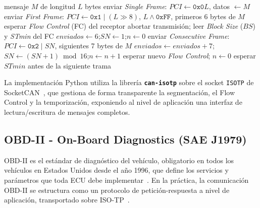 \begin{algorithm}[H]
\caption{Transmisión segmentada de un mensaje según ISO-TP (ISO~15765-2).}
\label{alg:isotp_tx}
\begin{algorithmic}[1]
\Require mensaje $M$ de longitud $L$ bytes
    \State enviar \textit{Single Frame}: $PCI \gets \texttt{0x0}L$, datos $\gets M$ 
    \State \Return
\EndIf
\State enviar \textit{First Frame}: $PCI \gets \texttt{0x1} \mathbin{|} (L \gg 8)$, $L \land \texttt{0xFF}$, primeros 6 bytes de $M$
\State esperar \textit{Flow Control} (FC) del receptor
 \State abortar transmisión; \Return \EndIf
\State leer \textit{Block Size} ($BS$) y \textit{STmin} del FC
\State $enviados \gets 6$;\quad $SN \gets 1$;\quad $n \gets 0$
    \State enviar \textit{Consecutive Frame}: $PCI \gets \texttt{0x2} \mathbin{|} SN$, siguientes 7 bytes de $M$
    \State $enviados \gets enviados + 7$;\quad $SN \gets (SN + 1) \bmod 16$;\quad $n \gets n + 1$
        \State esperar nuevo \textit{Flow Control}; \quad $n \gets 0$
    \Else
        \State esperar $STmin$ antes de la siguiente trama
    \EndIf
\EndWhile
\end{algorithmic}
\end{algorithm}

La implementación Python utiliza la librería \textbf{\texttt{can-isotp}} sobre el socket \texttt{ISOTP} de SocketCAN~\cite{LinuxKernel_ISOTP}, que gestiona de forma transparente la segmentación, el Flow Control y la temporización, exponiendo al nivel de aplicación una interfaz de lectura/escritura de mensajes completos.

\subsection{OBD-II - On-Board Diagnostics (SAE J1979)}
\label{sec:proto_obd2}

OBD-II es el estándar de diagnóstico del vehículo, obligatorio en todos los vehículos en Estados Unidos desde el año 1996, que define los servicios y parámetros que toda ECU debe implementar~\cite{SAEJ1979:2014, CARB_OBDII}. En la práctica, la comunicación OBD-II se estructura como un protocolo de petición-respuesta a nivel de aplicación, transportado sobre ISO-TP~\cite{ISO15765-4:2021}.

\begin{table}[H]
\caption{Estructura de trama OBD-II: petición (CAN ID \texttt{0x7E0}) y respuesta (CAN ID \texttt{0x7E8}) para el PID \texttt{0x0C} (RPM) según SAE~J1979~\cite{SAEJ1979:2014}.}
\label{tab:obd2_format}

\end{table}

